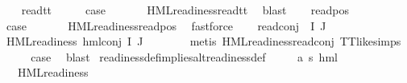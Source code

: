 \begin{isabellebody}
\ \ \isamarkupfalse%
\ read{\isacharunderscore}{\kern0pt}tt\isanewline
\ \ \isamarkupfalse%
\ \isamarkupfalse%
\ {\isacharquery}{\kern0pt}case\ \isanewline
\ \ \ \ \isamarkupfalse%
\ HML{\isacharunderscore}{\kern0pt}readiness{\isachardot}{\kern0pt}read{\isacharunderscore}{\kern0pt}tt\ \isamarkupfalse%
\ blast\isanewline
{}\isamarkupfalse%
\isanewline
\ \ \isamarkupfalse%
\ {\isacharparenleft}{\kern0pt}read{\isacharunderscore}{\kern0pt}pos\ {\isasymphi}\ {\isasymalpha}{\isacharparenright}{\kern0pt}\isanewline
\ \ \isamarkupfalse%
\ \isamarkupfalse%
\ {\isacharquery}{\kern0pt}case\ \isanewline
\ \ \ \ \isamarkupfalse%
\ HML{\isacharunderscore}{\kern0pt}readiness{\isachardot}{\kern0pt}read{\isacharunderscore}{\kern0pt}pos\ \isamarkupfalse%
\ fastforce\isanewline
{}\isamarkupfalse%
\isanewline
\ \ \isamarkupfalse%
\ {\isacharparenleft}{\kern0pt}read{\isacharunderscore}{\kern0pt}conj\ {\isasymPhi}\ I\ J{\isacharparenright}{\kern0pt}\isanewline
\ \ \isamarkupfalse%
\ {\isachardoublequoteopen}HML{\isacharunderscore}{\kern0pt}readiness\ {\isacharparenleft}{\kern0pt}hml{\isacharunderscore}{\kern0pt}conj\ I\ J\ {\isasymPhi}{\isacharparenright}{\kern0pt}{\isachardoublequoteclose}\ \isanewline
\ \ \ \ \isamarkupfalse%
\ {\isacharparenleft}{\kern0pt}metis\ HML{\isacharunderscore}{\kern0pt}readiness{\isachardot}{\kern0pt}read{\isacharunderscore}{\kern0pt}conj\ TT{\isacharunderscore}{\kern0pt}like{\isachardot}{\kern0pt}simps{\isacharparenright}{\kern0pt}\isanewline
\ \ \isamarkupfalse%
\ \isamarkupfalse%
\ {\isacharquery}{\kern0pt}case\ \isamarkupfalse%
\ blast\isanewline
{}\isamarkupfalse%
%
\endisatagproof
{\isafoldproof}%
%
\isadelimproof
\isanewline
%
\endisadelimproof
\isanewline
{}\isamarkupfalse%
\ readiness{\isacharunderscore}{\kern0pt}def{\isacharunderscore}{\kern0pt}implies{\isacharunderscore}{\kern0pt}alt{\isacharunderscore}{\kern0pt}readiness{\isacharunderscore}{\kern0pt}def{\isacharcolon}{\kern0pt}\isanewline
\ \ \ {\isasymphi}\ {\isacharcolon}{\kern0pt}{\isacharcolon}{\kern0pt}\ {\isachardoublequoteopen}{\isacharparenleft}{\kern0pt}{\isacharprime}{\kern0pt}a{\isacharcomma}{\kern0pt}\ {\isacharprime}{\kern0pt}s{\isacharparenright}{\kern0pt}\ hml{\isachardoublequoteclose}\isanewline
\ \ \ {\isachardoublequoteopen}HML{\isacharunderscore}{\kern0pt}readiness\ {\isasymphi}{\isachardoublequoteclose}\isanewline

\end{isabellebody}
